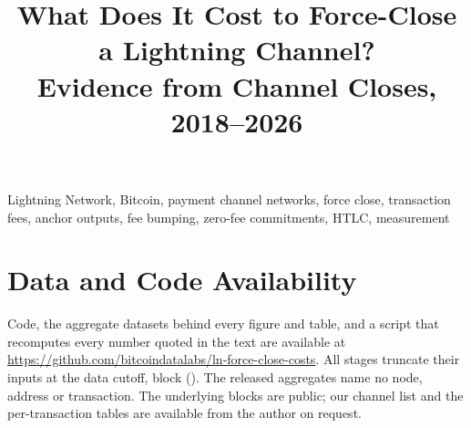 \documentclass[conference]{IEEEtran}
\newcommand{\PaperTitle}{What Does It Cost to Force-Close a Lightning Channel?}
\newcommand{\PaperSubtitle}{Evidence from \NClosesTitle{} Channel Closes, 2018--2026}
\begin{document}
\title{\PaperTitle\\
{\LARGE \PaperSubtitle}}

\author{
}

\maketitle
\thispagestyle{plain}
\pagestyle{plain}

\begin{abstract}

\end{abstract}

\begin{IEEEkeywords}
Lightning Network, Bitcoin, payment channel networks, force close, transaction fees, anchor outputs, fee bumping,
zero-fee commitments, HTLC, measurement
\end{IEEEkeywords}












\appendices


\section*{Data and Code Availability}
Code, the aggregate datasets behind every figure and table, and a script that recomputes every number quoted in the
text are available at \url{https://github.com/bitcoindatalabs/ln-force-close-costs}. All stages truncate their
inputs at the data cutoff, block \CutoffHeight{} (\CutoffDate). The released aggregates name no node, address or
transaction. The underlying blocks are public; our channel list and the per-transaction tables are available from
the author on request.



\end{document}
